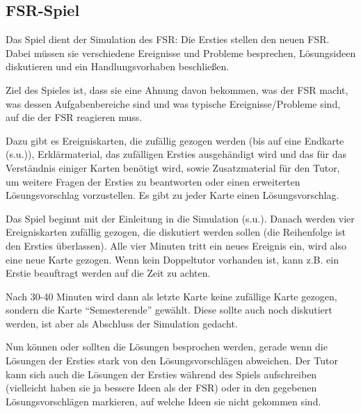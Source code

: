 \documentclass[a4paper,11pt]{scrartcl} %
\begin{document}
\subsection{FSR-Spiel} Das Spiel dient der Simulation des FSR: Die 
Ersties stellen den neuen FSR. Dabei müssen sie verschiedene Ereignisse 
und Probleme besprechen, Lösungsideen diskutieren und ein 
Handlungsvorhaben beschließen.

Ziel des Spieles ist, dass sie eine Ahnung davon bekommen, was der 
FSR macht, was dessen Aufgabenbereiche sind und was typische 
Ereignisse/Probleme sind, auf die der FSR reagieren muss.

Dazu gibt es Ereigniskarten, die zufällig gezogen werden (bis auf eine Endkarte (s.u.)), Erklärmaterial, das zufälligen Ersties
ausgehändigt wird und das für das Verständnis einiger Karten benötigt 
wird, sowie Zusatzmaterial für den Tutor, um weitere Fragen der Ersties
zu beantworten oder einen erweiterten Lösungsvorschlag vorzustellen. 
Es gibt zu jeder Karte einen Lösungsvorschlag.

Das Spiel beginnt mit der Einleitung in die Simulation (s.u.). Danach 
werden vier Ereigniskarten zufällig gezogen, die 
diskutiert werden sollen (die Reihenfolge ist den Ersties überlassen).
Alle vier Minuten tritt ein neues Ereignis ein, wird also eine neue 
Karte gezogen. Wenn kein Doppeltutor vorhanden ist, kann z.B. ein Erstie 
beauftragt werden auf die Zeit zu achten.

Nach 30-40 Minuten wird dann als letzte Karte keine zufällige Karte 
gezogen, sondern die Karte "`Semesterende"' gewählt. Diese sollte auch 
noch diskutiert werden, ist aber als Abschluss der Simulation gedacht.

Nun können oder sollten die Lösungen besprochen werden, gerade wenn 
die Lösungen der Ersties stark von den Lösungsvorschlägen abweichen.
Der Tutor kann sich auch die Lösungen der Ersties während des Spiels 
aufschreiben (vielleicht haben sie ja bessere Ideen als der FSR) oder 
in den gegebenen Lösungsvorschlägen markieren, auf welche Ideen sie nicht 
gekommen sind.
\end{document}
